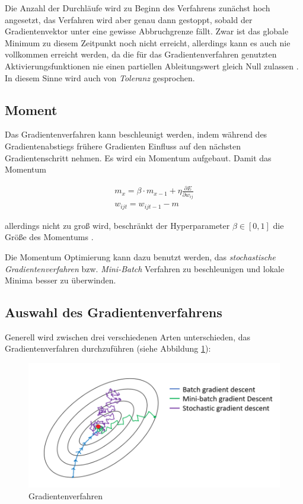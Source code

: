 Die Anzahl der Durchläufe wird zu Beginn des Verfahrens zunächst hoch angesetzt, das Verfahren wird aber genau dann gestoppt, sobald der Gradientenvektor unter eine gewisse Abbruchgrenze fällt. Zwar ist das globale Minimum zu diesem Zeitpunkt noch nicht erreicht, allerdings kann es auch nie vollkommen erreicht werden, da die für das Gradientenverfahren genutzten Aktivierungsfunktionen nie einen partiellen Ableitungswert gleich Null zulassen \cite{AurelienGeron.2018}. In diesem Sinne wird auch von \textit{Toleranz} gesprochen.

\subsection*{Moment}

Das Gradientenverfahren kann beschleunigt werden, indem während des Gradientenabstiegs frühere Gradienten Einfluss auf den nächsten Gradientenschritt nehmen. Es wird ein \glqq Momentum\grqq{} aufgebaut. Damit das Momentum 

\begin{equation} \label{momentum}
\begin{split}
m_x = \beta \cdot m_{x-1} + \eta\frac{\partial E}{\partial w_{ij}} \\
w_{ijt} = w_{ijt-1} - m 
\end{split}
\end{equation}

allerdings nicht zu groß wird, beschränkt der Hyperparameter $\beta \in [0,1]$ die Größe des Momentums \cite{AurelienGeron.2018}.

Die Momentum Optimierung kann dazu benutzt werden, das \textit{stochastische Gradientenverfahren} bzw. \textit{Mini-Batch} Verfahren zu beschleunigen und lokale Minima besser zu überwinden.

\subsection*{Auswahl des Gradientenverfahrens}

Generell wird zwischen drei verschiedenen Arten unterschieden, das Gradientenverfahren durchzuführen (siehe Abbildung \ref{gradient}):

\begin{figure}[H]
	\begin{center}
		\includegraphics[width=15cm]{Bilder/gradient_descent.png} 
		\caption[Gradientenverfahren]{Gradientenverfahren \cite{ImadDabbura.20171221}}
		\label{gradient}
	\end{center}
\end{figure}

